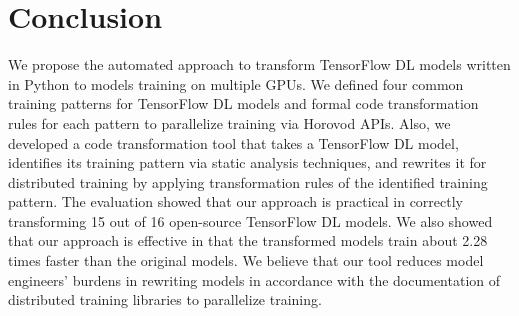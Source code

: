 \section{Conclusion}\label{sec:conclusion}
We propose the automated approach to transform TensorFlow DL models written in
Python to models training on multiple GPUs.
We defined four common training patterns for TensorFlow DL models and formal
code transformation rules for each pattern to parallelize training via Horovod
APIs.
Also, we developed a code transformation tool that takes a TensorFlow DL model,
identifies its training pattern via static analysis techniques, and rewrites
it for distributed training by applying transformation rules of the identified
training pattern.
The evaluation showed that our approach is practical in correctly transforming
15 out of 16 open-source TensorFlow DL models.
We also showed that our approach is effective in that the transformed models
train about 2.28 times faster than the original models.
We believe that our tool reduces model engineers' burdens in rewriting models
in accordance with the documentation of distributed training libraries to
parallelize training.






